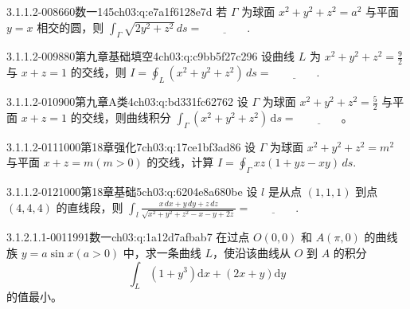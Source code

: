 \begin{q}{3.1.1.2-008}{660数一145}{ch03:q:e7a1f6128e7d}
若 $\Gamma$ 为球面 $x^2+y^2+z^2=a^2$ 与平面 $y=x$ 相交的圆，则 $\displaystyle\int_{\Gamma}\sqrt{2y^2+z^2}\,ds=\underline{\hspace{4em}}$.
\end{q}

\begin{q}{3.1.1.2-009}{880第九章基础填空4}{ch03:q:c9bb5f27c296}
设曲线 $L$ 为 $x^2+y^2+z^2=\frac{9}{2}$ 与 $x+z=1$ 的交线，则 $\displaystyle I=\oint_L (x^2+y^2+z^2)\,ds = \underline{\hspace{4em}}.$
\end{q}

\begin{q}{3.1.1.2-010}{900第九章A类4}{ch03:q:bd331fc62762}
设 $\Gamma$ 为球面 $x^2+y^2+z^2=\frac{5}{2}$ 与平面 $x+z=1$ 的交线，则曲线积分 $\displaystyle \int_{\Gamma}(x^2+y^2+z^2)\,\mathrm{d}s=\underline{\hspace{4em}}$。
\end{q}

\begin{q}{3.1.1.2-011}{1000第18章强化7}{ch03:q:17ce1bf3ad86}
设 $\Gamma$ 为球面 $x^2+y^2+z^2=m^2$ 与平面 $x+z=m(m>0)$ 的交线，计算 $\displaystyle I=\oint_{\Gamma} xz(1+yz-xy)\,ds$.
\end{q}

\begin{q}{3.1.1.2-012}{1000第18章基础5}{ch03:q:6204e8a680be}
设 $l$ 是从点 $(1,1,1)$ 到点 $(4,4,4)$ 的直线段，则
$\displaystyle \int_{l}\frac{x\,dx+y\,dy+z\,dz}{\sqrt{x^2+y^2+z^2-x-y+2z}}=\underline{\hspace{4em}}.$
\end{q}

\par\addvspace{2.4ex}\noindent
\begin{minipage}{\linewidth}



\begin{q}{3.1.2.1.1-001}{1991数一}{ch03:q:1a12d7afbab7}
在过点 $O(0,0)$ 和 $A(\pi,0)$ 的曲线族 $y=a\sin x(a>0)$ 中，求一条曲线 $L$，使沿该曲线从 $O$ 到 $A$ 的积分
\[
\int_L (1+y^3)\mathrm{d}x+(2x+y)\mathrm{d}y
\]
的值最小。
\end{q}
\end{minipage}


